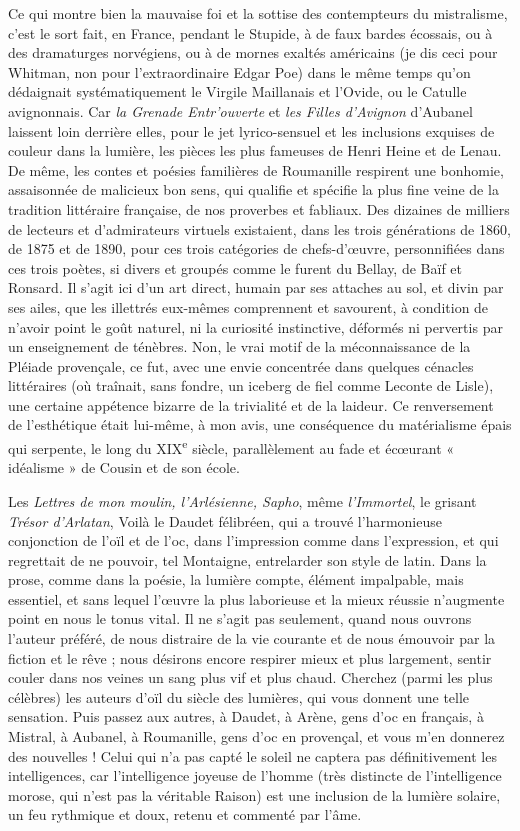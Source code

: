 \documentclass[french,twoside]{book} %
\begin{document}
Ce qui montre bien la mauvaise foi et la sottise des contempteurs du mistralisme, c’est le sort fait, en France, pendant le Stupide, à de faux bardes écossais, ou à des dramaturges norvégiens, ou à de mornes exaltés américains (je dis ceci pour Whitman, non pour l’extraordinaire Edgar Poe) dans le même temps qu’on dédaignait systématiquement le Virgile Maillanais et l’Ovide, ou le Catulle avignonnais. Car {\itshape la Grenade Entr’ouverte} et {\itshape les Filles d’Avignon} d’Aubanel laissent loin derrière elles, pour le jet lyrico-sensuel et les inclusions exquises de couleur dans la lumière, les pièces les plus fameuses de Henri Heine et de Lenau. De même, les contes et poésies familières de Roumanille respirent une bonhomie, assaisonnée de malicieux bon sens, qui qualifie et spécifie la plus fine veine de la tradition littéraire française, de nos proverbes et fabliaux. Des dizaines de milliers de lecteurs et d’admirateurs virtuels existaient, dans les trois générations de 1860, de 1875 et de 1890, pour ces trois catégories de chefs-d’œuvre, personnifiées dans ces trois poètes, si divers et groupés comme le furent du Bellay, de Baïf et Ronsard. Il s’agit ici d’un art direct, humain par ses attaches au sol, et divin par ses ailes, que les illettrés eux-mêmes comprennent et savourent, à condition de n’avoir point le goût naturel, ni la curiosité instinctive, déformés ni pervertis par un enseignement de ténèbres. Non, le vrai motif de la méconnaissance de la Pléiade provençale, ce fut, avec une envie concentrée dans quelques cénacles littéraires (où traînait, sans fondre, un iceberg de fiel comme Leconte de Lisle), une certaine appétence bizarre de la trivialité et de la laideur. Ce renversement de l’esthétique était lui-même, à mon avis, une conséquence du matérialisme épais qui serpente, le long du XIX\textsuperscript{e} siècle, parallèlement au fade et écœurant « idéalisme » de Cousin et de son école.\par
Les {\itshape Lettres de mon moulin, l’Arlésienne, Sapho}, même {\itshape l’Immortel}, le grisant {\itshape Trésor d’Arlatan}, Voilà le Daudet félibréen, qui a trouvé l’harmonieuse conjonction de l’oïl et de l’oc, dans l’impression comme dans l’expression, et qui regrettait de ne pouvoir, tel Montaigne, entrelarder son style de latin. Dans la prose, comme dans la poésie, la lumière compte, élément impalpable, mais essentiel, et sans lequel l’œuvre la plus laborieuse et la mieux réussie n’augmente point en nous le tonus vital. Il ne s’agit pas seulement, quand nous ouvrons l’auteur préféré, de nous distraire de la vie courante et de nous émouvoir par la fiction et le rêve ; nous désirons encore respirer mieux et plus largement, sentir couler dans nos veines un sang plus vif et plus chaud. Cherchez (parmi les plus célèbres) les auteurs d’oïl du siècle des lumières, qui vous donnent une telle sensation. Puis passez aux autres, à Daudet, à Arène, gens d’oc en français, à Mistral, à Aubanel, à Roumanille, gens d’oc en provençal, et vous m’en donnerez des nouvelles ! Celui qui n’a pas capté le soleil ne captera pas définitivement les intelligences, car l’intelligence joyeuse de l’homme (très distincte de l’intelligence morose, qui n’est pas la véritable Raison) est une inclusion de la lumière solaire, un feu rythmique et doux, retenu et commenté par l’âme.\par
\end{document}
